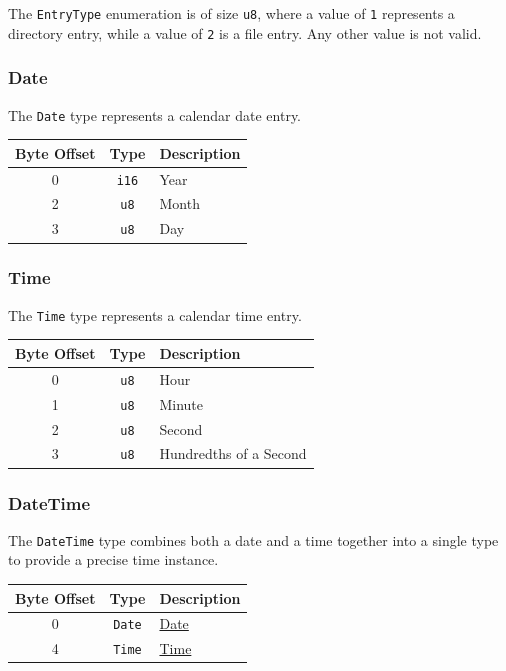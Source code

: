 \documentclass{article}
\begin{document}
The \texttt{EntryType} enumeration is of size \texttt{u8}, where a value of \texttt{1} represents a directory entry, while a value of \texttt{2} is a file entry. Any other value is not valid.

\subsubsection{Date}
\label{sec:type-date}

The \texttt{Date} type represents a calendar date entry.

\begin{table}[h!]
    \centering
    \begin{tabular}{cc|l}
        \hline
        Byte Offset & Type & Description \\
        \hline
        0 & \texttt{i16} & Year \\
        2 & \texttt{u8} & Month \\
        3 & \texttt{u8} & Day \\
        \hline
    \end{tabular}
\end{table}

\subsubsection{Time}
\label{sec:type-time}

The \texttt{Time} type represents a calendar time entry.

\begin{table}[h!]
    \centering
    \begin{tabular}{cc|l}
        \hline
        Byte Offset & Type & Description \\
        \hline
        0 & \texttt{u8} & Hour \\
        1 & \texttt{u8} & Minute \\
        2 & \texttt{u8} & Second \\
        3 & \texttt{u8} & Hundredths of a Second \\
        \hline
    \end{tabular}
\end{table}

\subsubsection{DateTime}
\label{sec:type-datetime}

The \texttt{DateTime} type combines both a date and a time together into a single type to provide a precise time instance.
\begin{table}[h!]
    \centering
    \begin{tabular}{cc|l}
        \hline
        Byte Offset & Type & Description \\
        \hline
        0 & \texttt{Date} & \hyperref[sec:type-date]{Date} \\
        4 & \texttt{Time} & \hyperref[sec:type-time]{Time} \\
        \hline
    \end{tabular}
\end{table}
\end{document}
